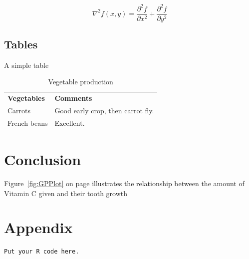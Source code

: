 \documentclass[a4paper,11pt]{article}
\begin{document}
$$\nabla^2 f(x,y) = \frac{\partial^2 f}{\partial x^2}
+ \frac{\partial^2 f}{\partial y^2}$$

\subsection{Tables}
A simple table

\begin{table}[htb]
\centering
\begin{tabular}{ll}
\textbf{Vegetables} & \textbf{Comments} \\
Carrots & Good early crop, then carrot fly. \\
French beans & Excellent.\\
\end{tabular}
\caption{Vegetable production}
\end{table}

\section{Conclusion}
Figure~\ref{fig:GPPlot} on page \pageref{fig:GPPlot} illustrates
the relationship between the amount of Vitamin C given and
their tooth growth

\clearpage
\section*{Appendix}
\begin{verbatim}
Put your R code here.
\end{verbatim}
\end{document}
